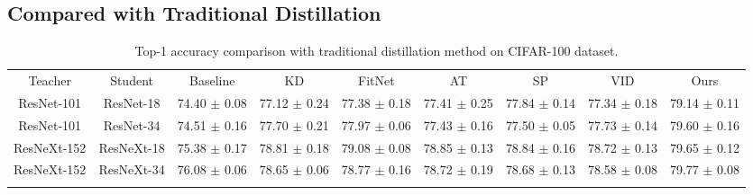 \documentclass[letterpaper]{article} %
\begin{document}
\subsection{Compared with Traditional Distillation}


\begin{table*}[t]
	\begin{center}
		\resizebox{1\linewidth}{!}
		{
			\begin{tabular}{c|c|ccccccc}
				\hline\noalign{\smallskip}
				Teacher		& Student 	& Baseline 			& KD 	            & FitNet 	        & AT	            & SP	                & VID		 & Ours 		\\
				\noalign{\smallskip}\hline\noalign{\smallskip}
				ResNet-101	& ResNet-18	& 74.40 $\pm$ 0.08	& 77.12 $\pm$ 0.24  & 77.38 $\pm$ 0.18	& 77.41 $\pm$ 0.25	& 77.84 $\pm$ 0.14     & 77.34 $\pm$ 0.18  & 79.14 $\pm$ 0.11	\\
				ResNet-101	& ResNet-34	& 74.51 $\pm$ 0.16	& 77.70 $\pm$ 0.21	& 77.97 $\pm$ 0.06	& 77.43 $\pm$ 0.16	& 77.50 $\pm$ 0.05	    & 77.73 $\pm$ 0.14  & 79.60 $\pm$ 0.16	\\
				\noalign{\smallskip}\hline\noalign{\smallskip}
				ResNeXt-152	& ResNeXt-18 & 75.38 $\pm$ 0.17	& 78.81 $\pm$ 0.18 	& 79.08 $\pm$ 0.08  & 78.85 $\pm$ 0.13	& 78.84 $\pm$ 0.16		 & 78.72 $\pm$ 0.13	 & 79.65 $\pm$ 0.12	\\
				ResNeXt-152 & ResNeXt-34 & 76.08 $\pm$ 0.06	& 78.65 $\pm$ 0.06  & 78.77 $\pm$ 0.16	& 78.72 $\pm$ 0.19	& 78.68 $\pm$ 0.13		 & 78.58 $\pm$ 0.08	 & 79.77 $\pm$ 0.08	\\
				\noalign{\smallskip}\hline
			\end{tabular}
		}
		\caption{Top-1 accuracy comparison with traditional distillation method on CIFAR-100 dataset.}
		\label{table:traditional_kd_comparison}
	\end{center}
\end{table*}


\end{document}
